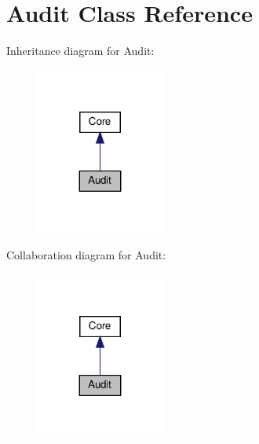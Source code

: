 \hypertarget{classAudit}{}\section{Audit Class Reference}
\label{classAudit}


Inheritance diagram for Audit\+:
\nopagebreak
\begin{figure}[H]
\begin{center}
\leavevmode
\includegraphics[width=119pt]{classAudit__inherit__graph}
\end{center}
\end{figure}


Collaboration diagram for Audit\+:
\nopagebreak
\begin{figure}[H]
\begin{center}
\leavevmode
\includegraphics[width=119pt]{classAudit__coll__graph}
\end{center}
\end{figure}
